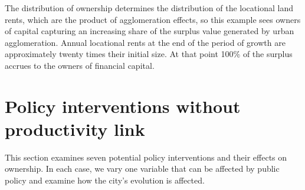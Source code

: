 The distribution of ownership determines the distribution of the locational land rents, which are the product of agglomeration effects, so this example sees owners of capital capturing an increasing share of the surplus value generated by urban agglomeration. %
Annual locational rents at the end of the period of growth are approximately twenty times their initial size. At that point 100\% of the surplus accrues to the owners of financial capital.


\hspace{1.5cm}

\section{Policy interventions without productivity link}


This section examines seven potential policy interventions and their effects on ownership. In each case, we vary one variable that can be affected by public policy and examine how the city's evolution is affected.

